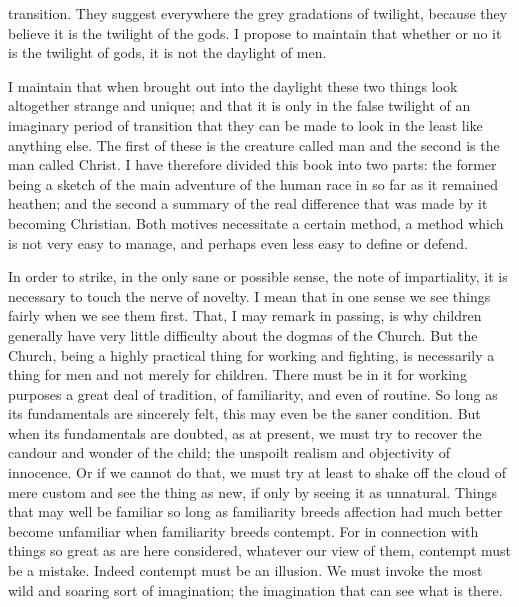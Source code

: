transition. They suggest everywhere the grey gradations of twilight, because they believe it is the twilight of the gods. I propose to maintain that whether or no it is the twilight of gods, it is not the daylight of men.

I maintain that when brought out into the daylight these two things look altogether strange and unique; and that it is only in the false twilight of an imaginary period of transition that they can be made to look in the least like anything else. The first of these is the creature called man and the second is the man called Christ. I have therefore divided this book into two parts: the former being a sketch of the main adventure of the human race in so far as it remained heathen; and the second a summary of the real difference that was made by it becoming Christian. Both motives necessitate a certain method, a method which is not very easy to manage, and perhaps even less easy to define or defend.

In order to strike, in the only sane or possible sense, the note of impartiality, it is necessary to touch the nerve of novelty. I mean that in one sense we see things fairly when we see them first. That, I may remark in passing, is why children generally have very little difficulty about the dogmas of the Church. But the Church, being a highly practical thing for working and fighting, is necessarily a thing for men and not merely for children. There must be in it for working purposes a great deal of tradition, of familiarity, and even of routine. So long as its fundamentals are sincerely felt, this may even be the saner condition. But when its fundamentals are doubted, as at present, we must try to recover the candour and wonder of the child; the unspoilt realism and objectivity of innocence. Or if we cannot do that, we must try at least to shake off the cloud of mere custom and see the thing as new, if only by seeing it as unnatural. Things that may well be familiar so long as familiarity breeds affection had much better become unfamiliar when familiarity breeds contempt. For in connection with things so great as are here considered, whatever our view of them, contempt must be a mistake. Indeed contempt must be an illusion. We must invoke the most wild and soaring sort of imagination; the imagination that can see what is there.

